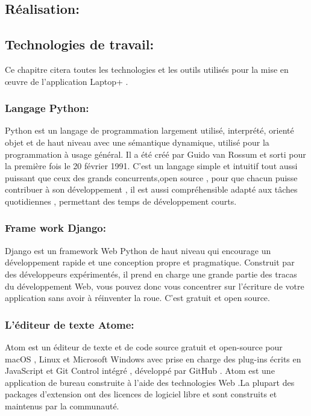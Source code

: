 \documentclass[a4paper]{report}
\begin{document}
\begin{doublespace}
	\chapter{Réalisation:}
	\fancyhead[L]{\hspace*{5cm}}
	
	
	\section{Technologies de travail:}
	Ce chapitre citera toutes les technologies et les
	outils utilisés pour la mise en œuvre de l'application Laptop+ .
	\subsection{Langage Python:}
	\begin{figure}[H]
		\raggedleft{
		}
	\end{figure}
	Python est un langage de programmation largement
	utilisé, interprété, orienté objet et de haut niveau avec une sémantique
	dynamique, utilisé pour la programmation à usage général. Il a été créé par
	Guido van Rossum et sorti pour la première fois le 20 février 1991. C'est un
	langage simple et intuitif tout aussi puissant que ceux des grands
	concurrents,open source , pour que chacun puisse contribuer à son développement
	, il est aussi compréhensible
	adapté aux tâches quotidiennes , permettant des temps
	de développement courts.
	
	\newpage
	
	\subsection{Frame work Django:}
	\begin{figure}[H]
		\raggedleft{
		}
	\end{figure}
	Django est un framework Web Python de haut niveau qui
	encourage un développement rapide et une conception propre et pragmatique.
	Construit par des développeurs expérimentés, il prend en charge une grande
	partie des tracas du développement Web, vous pouvez donc vous concentrer sur
	l'écriture de votre application sans avoir à réinventer la roue. C'est gratuit
	et open source.
	
	\subsection{L'éditeur de texte Atome:}
	\begin{figure}[H]
		\raggedleft{
		}
	\end{figure}
	Atom est un éditeur de texte et de code source gratuit
	et open-source pour macOS , Linux et Microsoft Windows avec prise en charge des
	plug-ins écrits en JavaScript et Git Control intégré , développé par GitHub .
	Atom est une application de bureau construite à l'aide des technologies Web .La
	plupart des packages d'extension ont des licences de logiciel libre et sont
	construits et maintenus par la communauté.
	\newpage

\end{doublespace}
\end{document}
